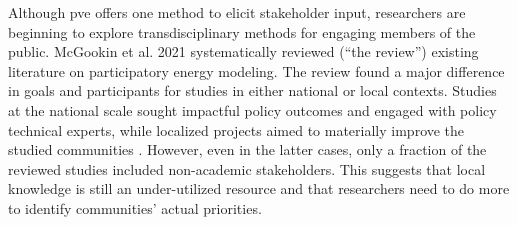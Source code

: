 Although \ac{pve} offers one method to elicit stakeholder input, researchers are
beginning to explore transdisciplinary methods for engaging members of the
public. McGookin et al. 2021 \cite{mcgookin_participatory_2021} systematically
reviewed (``the review'') existing literature on participatory energy modeling.
The review found a major difference in goals and participants for studies in
either national or local contexts. Studies at the national scale sought
impactful policy outcomes and engaged with policy technical experts, while
localized projects aimed to materially improve the studied communities
\cite{mcgookin_participatory_2021}. However, even in the latter cases, only a
fraction of the reviewed studies included non-academic stakeholders. This
suggests that local knowledge is still an under-utilized resource and that
researchers need to do more to identify communities' actual priorities.

